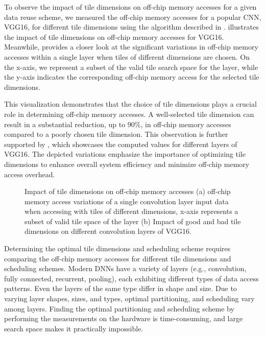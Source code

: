 To observe the impact of tile dimensions on off-chip memory accesses for a given data reuse scheme, we measured the off-chip memory accesses for a popular CNN, VGG16, for different tile dimensions using the algorithm described in .  illustrates the impact of tile dimensions on off-chip memory accesses for VGG16. Meanwhile,  provides a closer look at the significant variations in off-chip memory accesses within a single layer when tiles of different dimensions are chosen. On the x-axis, we represent a subset of the valid tile search space for the layer, while the y-axis indicates the corresponding off-chip memory access for the selected tile dimensions.

This visualization demonstrates that the choice of tile dimensions plays a crucial role in determining off-chip memory accesses. A well-selected tile dimension can result in a substantial reduction, up to 90\%, in off-chip memory accesses compared to a poorly chosen tile dimension. This observation is further supported by , which showcases the computed values for different layers of VGG16. The depicted variations emphasize the importance of optimizing tile dimensions to enhance overall system efficiency and minimize off-chip memory access overhead.

\begin{figure}[!h]
	\centering
	\captionsetup{font=sf}
	\hfil	
	\hfil	
	\caption{Impact of tile dimensions on off-chip memory accesses (a) off-chip memory access variations of a single convolution layer input data when accessing with tiles of different dimensions, x-axis represents a subset of valid tile space of the layer (b) Impact of good and bad tile dimensions on different convolution layers of VGG16.}
	\label{fig:impactOfTileDims}
\end{figure}

Determining the optimal tile dimensions and scheduling scheme requires comparing the off-chip memory accesses for different tile dimensions and scheduling schemes. Modern DNNs have a variety of layers (e.g., convolution, fully connected, recurrent, pooling), each exhibiting different types of data access patterns. Even the layers of the same type differ in shape and size. Due to varying layer shapes, sizes, and types, optimal partitioning, and scheduling vary among layers. Finding the optimal partitioning and scheduling scheme by performing the measurements on the hardware is time-consuming, and large search space makes it practically impossible.

